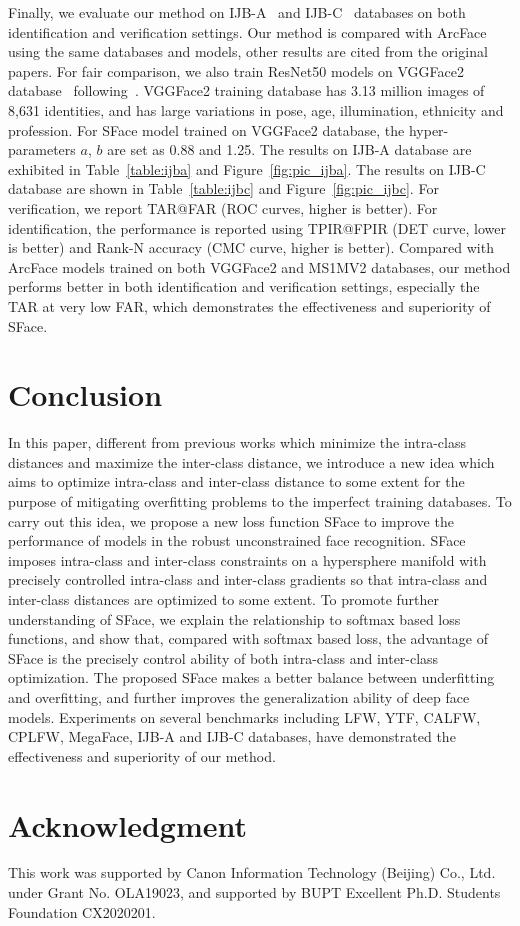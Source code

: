 \documentclass[journal,comsoc]{IEEEtran}
\begin{document}
Finally, we evaluate our method on IJB-A~\cite{klare2015pushing} and IJB-C~\cite{maze2018iarpa} databases on both identification and verification settings. Our method is compared with ArcFace using the same databases and models, other results are cited from the original papers. For fair comparison, we also train ResNet50 models on VGGFace2 database~\cite{Cao18} following~\cite{deng2019arcface}. VGGFace2 training database has 3.13 million images of 8,631 identities, and has large variations in pose, age, illumination, ethnicity and profession. For SFace model trained on VGGFace2 database, the hyper-parameters $a$, $b$ are set as 0.88 and 1.25. The results on IJB-A database are exhibited in Table~\ref{table:ijba} and Figure~\ref{fig:pic_ijba}. The results on IJB-C database are shown in Table~\ref{table:ijbc} and Figure~\ref{fig:pic_ijbc}. For verification, we report TAR@FAR (ROC curves, higher is better). For identification, the performance is reported using TPIR@FPIR (DET curve, lower is better) and Rank-N accuracy (CMC curve, higher is better). Compared with ArcFace models trained on both VGGFace2 and MS1MV2 databases, our method performs better in both identification and verification settings, especially the TAR at very low FAR, which demonstrates the effectiveness and superiority of SFace. 

\section{Conclusion}
\label{sec:conclusion}
In this paper, different from previous works which minimize the intra-class distances and maximize the inter-class distance, we introduce a new idea which aims to optimize intra-class and inter-class distance to some extent for the purpose of mitigating overfitting problems to the imperfect training databases. To carry out this idea, we propose a new loss function SFace to improve the performance of models in the robust unconstrained face recognition. SFace imposes intra-class and inter-class constraints on a hypersphere manifold with precisely controlled intra-class and inter-class gradients so that intra-class and inter-class distances are optimized to some extent. To promote further understanding of SFace, we explain the relationship to softmax based loss functions, and show that, compared with softmax based loss, the advantage of SFace is the precisely control ability of both intra-class and inter-class optimization. The proposed SFace makes a better balance between underfitting and overfitting, and further improves the generalization ability of deep face models. Experiments on several benchmarks including LFW, YTF, CALFW, CPLFW, MegaFace, IJB-A and IJB-C databases, have demonstrated the effectiveness and superiority of our method. 

\section*{Acknowledgment}
This work was supported by Canon
Information Technology (Beijing) Co., Ltd. under Grant
No. OLA19023, and supported by BUPT Excellent Ph.D. Students Foundation CX2020201.

\ifCLASSOPTIONcaptionsoff
\newpage
\fi
	


	
\end{document}
